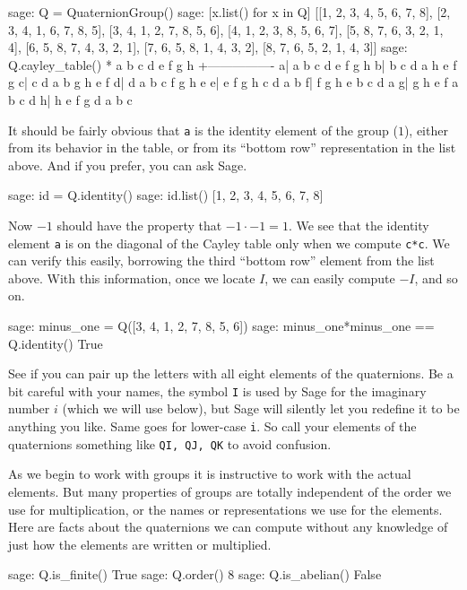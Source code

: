 %
\begin{sageexample}
sage: Q = QuaternionGroup()
sage: [x.list() for x in Q]
[[1, 2, 3, 4, 5, 6, 7, 8], [2, 3, 4, 1, 6, 7, 8, 5],
 [3, 4, 1, 2, 7, 8, 5, 6], [4, 1, 2, 3, 8, 5, 6, 7],
 [5, 8, 7, 6, 3, 2, 1, 4], [6, 5, 8, 7, 4, 3, 2, 1],
 [7, 6, 5, 8, 1, 4, 3, 2], [8, 7, 6, 5, 2, 1, 4, 3]]
sage: Q.cayley_table()
*  a b c d e f g h
 +----------------
a| a b c d e f g h
b| b c d a h e f g
c| c d a b g h e f
d| d a b c f g h e
e| e f g h c d a b
f| f g h e b c d a
g| g h e f a b c d
h| h e f g d a b c
\end{sageexample}
%
It should be fairly obvious that \verb?a? is the identity element of the group ($1$), either from its behavior in the table, or from its ``bottom row'' representation in the list above.  And if you prefer, you can ask Sage.
%
\begin{sageexample}
sage: id = Q.identity()
sage: id.list()
[1, 2, 3, 4, 5, 6, 7, 8]
\end{sageexample}
%
Now $-1$ should have the property that $-1\cdot -1= 1$.  We see that the identity element \verb?a? is on the diagonal of the Cayley table only when we compute \verb?c*c?.  We can verify this easily, borrowing the third ``bottom row'' element from the list above.  With this information, once we locate $I$, we can easily compute $-I$, and so on.
%
\begin{sageexample}
sage: minus_one = Q([3, 4, 1, 2, 7, 8, 5, 6])
sage: minus_one*minus_one == Q.identity()
True
\end{sageexample}
%
See if you can pair up the letters with all eight elements of the quaternions.  Be a bit careful with your names, the symbol \verb?I? is used by Sage for the imaginary number $i$ (which we will use below), but Sage will silently let you redefine it to be anything you like.  Same goes for lower-case \verb?i?.  So call your elements of the quaternions something like \verb?QI, QJ, QK? to avoid confusion.\par
%
As we begin to work with groups it is instructive to work with the actual elements.  But many properties of groups are totally independent of the order we use for multiplication, or the names or representations we use for the elements.  Here are facts about the quaternions we can compute without any knowledge of just how the elements are written or multiplied.
%
\begin{sageexample}
sage: Q.is_finite()
True
sage: Q.order()
8
sage: Q.is_abelian()
False
\end{sageexample}
%
